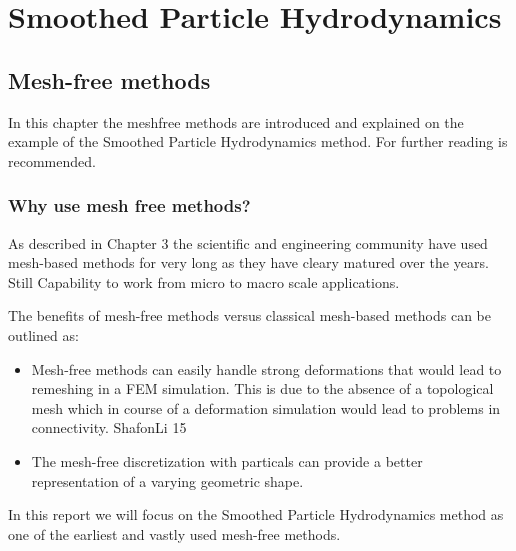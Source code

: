 
\chapter{Smoothed Particle Hydrodynamics} %

\label{Chapter 5} %



\section{Mesh-free methods}
In this chapter the meshfree methods are introduced and explained on the example of the Smoothed Particle
Hydrodynamics method. For further reading \citep{Liu2003} is recommended.

\subsection{Why use mesh free methods?}

As described in Chapter 3 the scientific and engineering community have used mesh-based methods for
very long as they have cleary matured over the years. Still
Capability to work from
micro to macro scale applications.

The benefits of mesh-free methods versus classical mesh-based methods can be outlined as:
\begin{itemize}
\item Mesh-free methods can easily handle strong deformations that would lead to
remeshing in a FEM simulation. This is due to the absence of a topological mesh which in course
of a deformation simulation would lead to problems in connectivity. ShafonLi 15
\item The mesh-free discretization with particals can provide a better representation of a varying
geometric shape.
\end{itemize}

In this report we will focus on the Smoothed Particle Hydrodynamics method as one of the earliest
and vastly used mesh-free methods.

